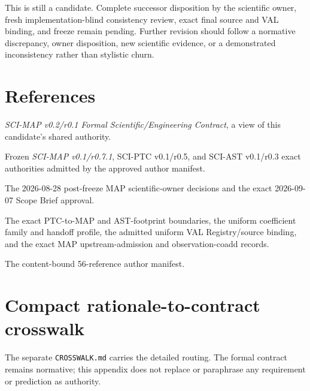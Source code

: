\documentclass[10pt]{article}
\newcommand{\code}[1]{\nolinkurl{#1}}
\begin{document}
This is still a candidate. Complete successor disposition by the scientific
owner, fresh implementation-blind consistency review, exact final source and
VAL binding, and freeze remain pending. Further revision should follow a
normative discrepancy, owner disposition, new scientific evidence, or a
demonstrated inconsistency rather than stylistic churn.

\section*{References}
\begin{enumerate}[label={[\arabic*]},leftmargin=*]
\item \emph{SCI-MAP v0.2/r0.1 Formal Scientific/Engineering Contract}, a view of this candidate's shared authority.
\item Frozen \emph{SCI-MAP v0.1/r0.7.1}, SCI-PTC v0.1/r0.5, and SCI-AST v0.1/r0.3 exact authorities admitted by the approved author manifest.
\item The 2026-08-28 post-freeze MAP scientific-owner decisions and the exact 2026-09-07 Scope Brief approval.
\item The exact PTC-to-MAP and AST-footprint boundaries, the uniform
coefficient family and handoff profile, the admitted uniform VAL
Registry/source binding, and the exact MAP upstream-admission and
observation-coadd records.
\item The content-bound 56-reference author manifest.
\end{enumerate}

\clearpage\appendix
\section{Compact rationale-to-contract crosswalk}\label{app:crosswalk}
The separate \code{CROSSWALK.md} carries the detailed
routing. The formal contract remains normative; this appendix does not replace
or paraphrase any requirement or prediction as authority.
\end{document}
